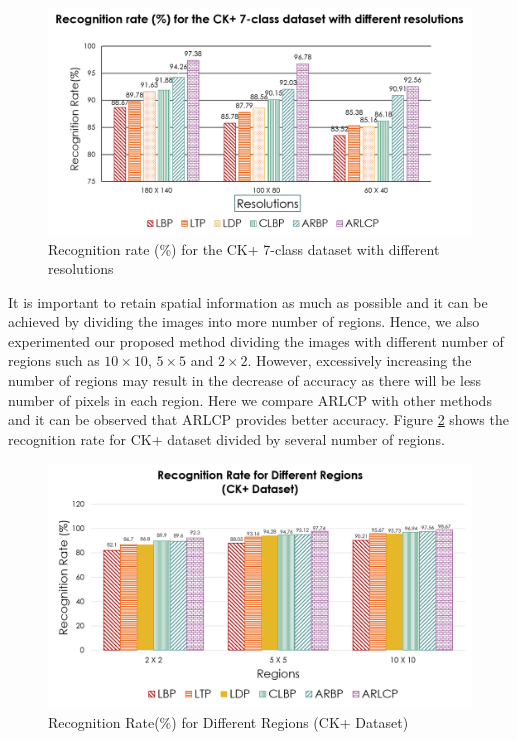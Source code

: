 \documentclass[12pt]{article}
\begin{document}
\begin{figure}[H]
	\begin{center}
		\includegraphics[width=\textwidth]{Picture5.png}			
		\caption{Recognition rate (\%) for the CK+ 7-class dataset with different resolutions}
		\label{fig:ck_plus_resolution}
	\end{center}
\end{figure}

It is important to retain spatial information as much as possible and it can be achieved by dividing the images into more number of regions. Hence, we also experimented our proposed method dividing the images with different number of regions such as $10 \times 10$, $5 \times 5$ and $2 \times 2$. However, excessively increasing the number of regions may result in the decrease of accuracy as there will be less number of pixels in each region. Here we compare ARLCP with other methods and it can be observed that ARLCP provides better accuracy. Figure \ref{fig:ck_plus_region} shows the recognition rate for  CK+ dataset divided by several number of regions.

\begin{figure}[H]
	\begin{center}
		\includegraphics[width=\textwidth]{a.png}			
		\caption{Recognition Rate(\%) for Different Regions (CK+ Dataset)}
		\label{fig:ck_plus_region}
	\end{center}
\end{figure}
\end{document}
